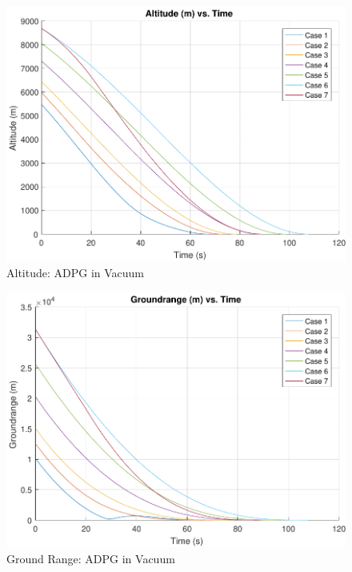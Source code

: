 \begin{figure}[H]
	\centering
	\begin{minipage}{4.5 in}
		\includegraphics[width=\linewidth]{Figures/altpowvac.pdf}
		\caption{Altitude: ADPG in Vacuum \label{fig:altpowvac} }
	\end{minipage}
\end{figure}

\begin{figure}[H]
	\centering
	\begin{minipage}{4.5 in}
		\includegraphics[width=\linewidth]{Figures/rngpowvac.pdf}
		\caption{Ground Range: ADPG in Vacuum \label{fig:rngpowvac} }
	\end{minipage}
\end{figure}

